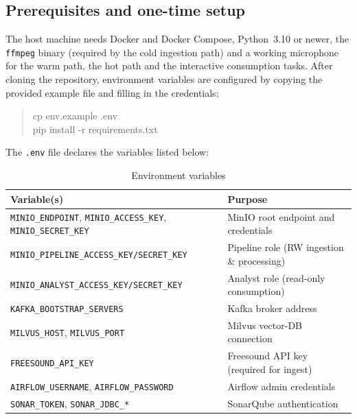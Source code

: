 \documentclass[11pt,a4paper]{article}
\begin{document}
\subsection{Prerequisites and one-time setup}
The host machine needs Docker and Docker Compose, Python~3.10 or newer, the \texttt{ffmpeg} binary (required by the cold ingestion path) and a working microphone for the warm path, the hot path and the interactive consumption tasks. After cloning the repository, environment variables are configured by copying the provided example file and filling in the credentials:
\begin{quote}\small\ttfamily
cp env.example .env\\
pip install -r requirements.txt
\end{quote}
The \texttt{.env} file declares the variables listed below:

\begin{table}[h]
\centering
\small
\begin{tabular}{ll}
\toprule
\textbf{Variable(s)} & \textbf{Purpose} \\
\midrule
\texttt{MINIO\_ENDPOINT}, \texttt{MINIO\_ACCESS\_KEY}, \texttt{MINIO\_SECRET\_KEY} & MinIO root endpoint and credentials \\
\texttt{MINIO\_PIPELINE\_ACCESS\_KEY/SECRET\_KEY} & Pipeline role (RW ingestion \& processing) \\
\texttt{MINIO\_ANALYST\_ACCESS\_KEY/SECRET\_KEY} & Analyst role (read-only consumption) \\
\texttt{KAFKA\_BOOTSTRAP\_SERVERS} & Kafka broker address \\
\texttt{MILVUS\_HOST}, \texttt{MILVUS\_PORT} & Milvus vector-DB connection \\
\texttt{FREESOUND\_API\_KEY} & Freesound API key (required for ingest) \\
\texttt{AIRFLOW\_USERNAME}, \texttt{AIRFLOW\_PASSWORD} & Airflow admin credentials \\
\texttt{SONAR\_TOKEN}, \texttt{SONAR\_JDBC\_*} & SonarQube authentication \\
\bottomrule
\end{tabular}
\caption{Environment variables}
\label{tab:envvars}
\end{table}
\end{document}
